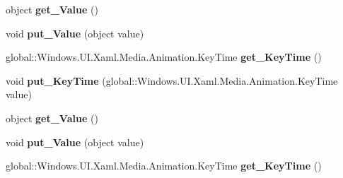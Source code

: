 \begin{DoxyCompactItemize}
object {\bfseries get\+\_\+\+Value} ()
\item 
\mbox{\label{interface_windows_1_1_u_i_1_1_xaml_1_1_media_1_1_animation_1_1_i_object_key_frame_ace1eb8eee944c8ccea95a4b439ff3f27}} 
void {\bfseries put\+\_\+\+Value} (object value)
\item 
\mbox{\label{interface_windows_1_1_u_i_1_1_xaml_1_1_media_1_1_animation_1_1_i_object_key_frame_a5a5e7923940305c167ff4aeadbb918e1}} 
global\+::\+Windows.\+U\+I.\+Xaml.\+Media.\+Animation.\+Key\+Time {\bfseries get\+\_\+\+Key\+Time} ()
\item 
\mbox{\label{interface_windows_1_1_u_i_1_1_xaml_1_1_media_1_1_animation_1_1_i_object_key_frame_afad5ba469666b91faed8df55c0c7efca}} 
void {\bfseries put\+\_\+\+Key\+Time} (global\+::\+Windows.\+U\+I.\+Xaml.\+Media.\+Animation.\+Key\+Time value)
\item 
\mbox{\label{interface_windows_1_1_u_i_1_1_xaml_1_1_media_1_1_animation_1_1_i_object_key_frame_a666644384dad0aa2681d1c72775e1946}} 
object {\bfseries get\+\_\+\+Value} ()
\item 
\mbox{\label{interface_windows_1_1_u_i_1_1_xaml_1_1_media_1_1_animation_1_1_i_object_key_frame_ace1eb8eee944c8ccea95a4b439ff3f27}} 
void {\bfseries put\+\_\+\+Value} (object value)
\item 
\mbox{\label{interface_windows_1_1_u_i_1_1_xaml_1_1_media_1_1_animation_1_1_i_object_key_frame_a5a5e7923940305c167ff4aeadbb918e1}} 
global\+::\+Windows.\+U\+I.\+Xaml.\+Media.\+Animation.\+Key\+Time {\bfseries get\+\_\+\+Key\+Time} ()
\item 
\mbox{\label{interface_windows_1_1_u_i_1_1_xaml_1_1_media_1_1_animation_1_1_i_object_key_frame_afad5ba469666b91faed8df55c0c7efca}} 

\end{DoxyCompactItemize}
